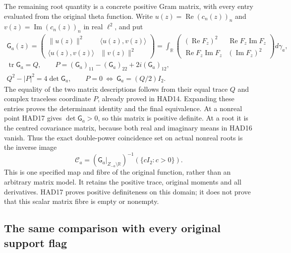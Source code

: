 The remaining root quantity is a concrete positive Gram
matrix, with every entry evaluated from the original
theta function. Write $u(z)=\operatorname{Re}(c_n(z))_n$
and $v(z)=\operatorname{Im}(c_n(z))_n$ in real $\ell^2$,
and put
\begin{equation}\tag{HAD18}
\begin{gathered}
 \mathsf G_a(z)=
 \begin{pmatrix}\|u(z)\|^2&\langle u(z),v(z)\rangle\\
                 \langle u(z),v(z)\rangle&\|v(z)\|^2\end{pmatrix}
 =\int_{\mathbb R}
 \begin{pmatrix}(\operatorname{Re}F_z)^2&
        \operatorname{Re}F_z\operatorname{Im}F_z\\
        \operatorname{Re}F_z\operatorname{Im}F_z&
        (\operatorname{Im}F_z)^2\end{pmatrix}d\gamma_a,\\
 \operatorname{tr}\mathsf G_a=Q,\qquad
 P=(\mathsf G_a)_{11}-(\mathsf G_a)_{22}
                               +2i(\mathsf G_a)_{12},\\
 Q^2-|P|^2=4\det\mathsf G_a,\qquad
 P=0\ \Longleftrightarrow\ \mathsf G_a=(Q/2)I_2.
\end{gathered}
\end{equation}
The equality of the two matrix descriptions follows
from their equal trace $Q$ and complex traceless
coordinate $P$, already proved in HAD14. Expanding
these entries proves the determinant identity and
the final equivalence. At a nonreal point HAD17 gives
$\det\mathsf G_a>0$, so this matrix is positive definite.
At a root it is the centred covariance matrix, because
both real and imaginary means in HAD16 vanish.
Thus the exact double-power coincidence set on actual
nonreal roots is the inverse image
\begin{equation}\tag{HAD19}
 \mathscr C_a=
 (\mathsf G_a|_{Z_{-a}\setminus\mathbb R})^{-1}
                  (\{cI_2:c>0\}).
\end{equation}
This is one specified map and fibre of the original
function, rather than an arbitrary matrix model.
It retains the positive trace, original moments and
all derivatives. HAD17 proves positive definiteness
on this domain; it does not prove that this scalar
matrix fibre is empty or nonempty.

\subsection{The same comparison with every original support flag}

